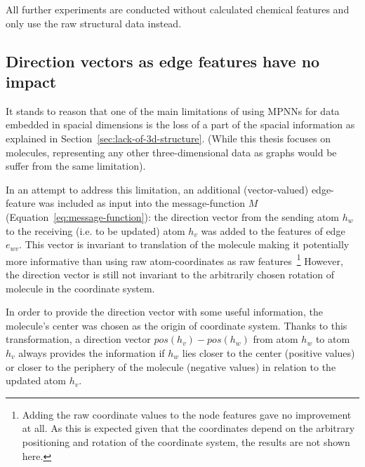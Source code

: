 All further experiments are conducted without calculated chemical features and only use the raw structural data instead.


\subsection{Direction vectors as edge features have no impact}
\label{sec:direction-vectors}

It stands to reason that one of the main limitations of using MPNNs for data embedded in spacial dimensions is the loss of a part of the spacial information as explained in Section~\ref{sec:lack-of-3d-structure}. (While this thesis focuses on molecules, representing any other three-dimensional data as graphs would be suffer from the same limitation).
	
In an attempt to address this limitation, an additional (vector-valued) edge-feature was included as input into the message-function $M$ (Equation~\ref{eq:message-function}): the direction vector from the sending atom $h_w$ to the receiving (i.e. to be updated) atom $h_v$ was added to the features of edge $e_{wv}$. This vector is invariant to translation of the molecule making it potentially more informative than using raw atom-coordinates as raw features~\footnote{Adding the raw coordinate values to the node features gave no improvement at all. As this is expected given that the coordinates depend on the arbitrary positioning and rotation of the coordinate system, the results are not shown here.} However, the direction vector is still not invariant to the arbitrarily chosen rotation of molecule in the coordinate system.

In order to provide the direction vector with some useful information, the molecule's center was chosen as the origin of coordinate system. Thanks to this transformation, a direction vector $pos(h_v) - pos(h_w)$ from atom $h_w$ to atom $h_v$ always provides the information if $h_w$ lies closer to the center (positive values) or closer to the periphery of the molecule (negative values) in relation to the updated atom $h_v$.

